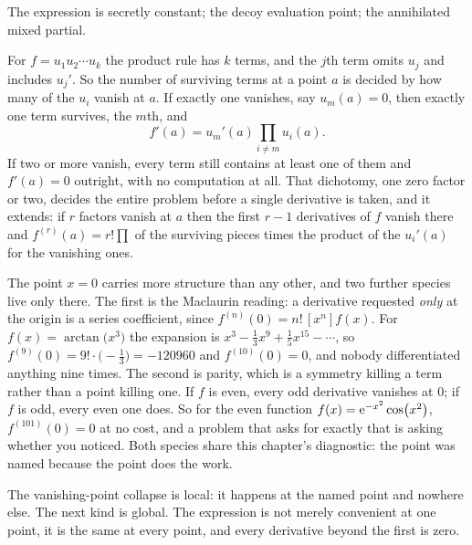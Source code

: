 \begin{seealsob}The expression is secretly constant; the decoy evaluation point; the annihilated mixed partial.\end{seealsob}

\begin{keynote}
For $f=u_{1}u_{2}\cdots u_{k}$ the product rule has $k$ terms, and the $j$th term omits $u_{j}$ and includes $u_{j}'$. So the number of surviving terms at a point $a$ is decided by how many of the $u_{i}$ vanish at $a$. If exactly one vanishes, say $u_{m}(a)=0$, then exactly one term survives, the $m$th, and
\[
f'(a)=u_{m}'(a)\prod_{i\neq m}u_{i}(a).
\]
If two or more vanish, every term still contains at least one of them and $f'(a)=0$ outright, with no computation at all. That dichotomy, one zero factor or two, decides the entire problem before a single derivative is taken, and it extends: if $r$ factors vanish at $a$ then the first $r-1$ derivatives of $f$ vanish there and $f^{(r)}(a)=r!\prod$ of the surviving pieces times the product of the $u_{i}'(a)$ for the vanishing ones.
\end{keynote}

\begin{keynote}
The point $x=0$ carries more structure than any other, and two further species live only there. The first is the Maclaurin reading: a derivative requested \emph{only} at the origin is a series coefficient, since $f^{(n)}(0)=n!\,[x^{n}]f(x)$. For $f(x)=\arctan\bigl(x^{3}\bigr)$ the expansion is $x^{3}-\tfrac13x^{9}+\tfrac15x^{15}-\cdots$, so $f^{(9)}(0)=9!\cdot\bigl(-\tfrac13\bigr)=-120960$ and $f^{(10)}(0)=0$, and nobody differentiated anything nine times. The second is parity, which is a symmetry killing a term rather than a point killing one. If $f$ is even, every odd derivative vanishes at $0$; if $f$ is odd, every even one does. So for the even function $f(x)=\mathrm{e}^{-x^{2}}\cos\bigl(x^{2}\bigr)$, $f^{(101)}(0)=0$ at no cost, and a problem that asks for exactly that is asking whether you noticed. Both species share this chapter's diagnostic: the point was named because the point does the work.
\end{keynote}

The vanishing-point collapse is local: it happens at the named point and nowhere else. The next kind is global. The expression is not merely convenient at one point, it is the same at every point, and every derivative beyond the first is zero.

